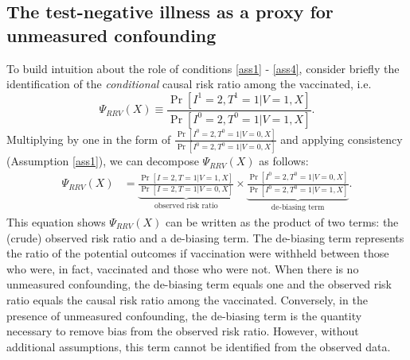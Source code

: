 \documentclass[11pt]{article}
\begin{document}
\subsection{The test-negative illness as a proxy for unmeasured confounding} \label{sec:effect_among_vaccinated}
To build intuition about the role of conditions \ref{ass1} - \ref{ass4}, consider briefly the identification of the \textit{conditional} causal risk ratio among the vaccinated, i.e.
\begin{equation*}
    \Psi_{RRV}(X) \equiv \frac{\Pr[I^1 = 2, T^1 = 1 | V = 1, X]}{\Pr[I^0 = 2, T^0 = 1 | V = 1, X]}.
\end{equation*}
Multiplying by one in the form of $\frac{\Pr[I^0 = 2, T^0 = 1| V = 0, X]}{\Pr[I^0 = 2, T^0 = 1 | V = 0, X]}$ and applying consistency (Assumption \ref{ass1}), we can decompose $\Psi_{RRV}(X)$ as follows:
\begin{align} \label{eqn:decomposition}
    \Psi_{RRV}(X) &=\underbrace{\frac{\Pr[I = 2, T = 1 | V = 1, X]}{\Pr[I = 2, T = 1 | V = 0, X]}}_{\text{observed risk ratio}} \times \underbrace{\frac{\Pr[I^0 = 2, T^0 = 1 | V = 0, X]}{\Pr[I^0 = 2, T^0 = 1 | V = 1, X]}}_{\text{de-biasing term}}.
\end{align}
This equation shows $\Psi_{RRV}(X)$ can be written as the product of two terms: the (crude) observed risk ratio and a de-biasing term. The de-biasing term represents the ratio of the potential outcomes if vaccination were withheld between those who were, in fact, vaccinated and those who were not. When there is no unmeasured confounding, the de-biasing term equals one and the observed risk ratio equals the causal risk ratio among the vaccinated. Conversely, in the presence of unmeasured confounding, the de-biasing term is the quantity necessary to remove bias from the observed risk ratio. However, without additional assumptions, this term cannot be identified from the observed data. 
\end{document}
